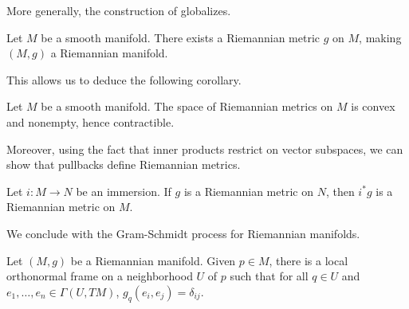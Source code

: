 More generally, the construction of  globalizes. 
\begin{theorem}\label{thm: existence of Riemannian metric}
    Let $M$ be a smooth manifold. There exists a Riemannian metric $g$ on $M$, making $(M,g)$ a Riemannian manifold. 
\end{theorem}
This allows us to deduce the following corollary. 
\begin{corollary}
    Let $M$ be a smooth manifold. The space of Riemannian metrics on $M$ is convex and nonempty, hence contractible. 
\end{corollary}
Moreover, using the fact that inner products restrict on vector subspaces, we can show that pullbacks define Riemannian metrics. 
\begin{lemma}\label{lem: immersions pullback is metric}
    Let $i:M\to N$ be an immersion. If $g$ is a Riemannian metric on $N$, then $i^{*}g$ is a Riemannian metric on $M$. 
\end{lemma}
We conclude with the Gram-Schmidt process for Riemannian manifolds. 
\begin{proposition}\label{prop: Gram-Schmidt for Riemannian manifolds}
    Let $(M,g)$ be a Riemannian manifold. Given $p\in M$, there is a local orthonormal frame on a neighborhood $U$ of $p$ such that for all $q\in U$ and $e_{1},\dots,e_{n}\in\Gamma(U,TM)$, $g_{q}(e_{i},e_{j})=\delta_{ij}$. 
\end{proposition}